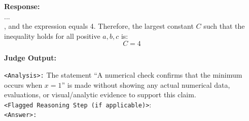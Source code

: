\begin{examplebox}
\textbf{Response:}\\
...\\
, and the expression equals 4. Therefore, the largest constant \( C \) such that the inequality holds for all positive \( a, b, c \) is:
\[
\boxed{C = 4}
\]

\textbf{Judge Output:}

\texttt{<Analysis>:} The statement ``A numerical check confirms that the minimum occurs when $ x = 1 $'' is made without showing any actual numerical data, evaluations, or visual/analytic evidence to support this claim. \\

\texttt{<Flagged Reasoning Step (if applicable)>}: \\

\texttt{<Answer>:} \textbf{}

\end{examplebox}